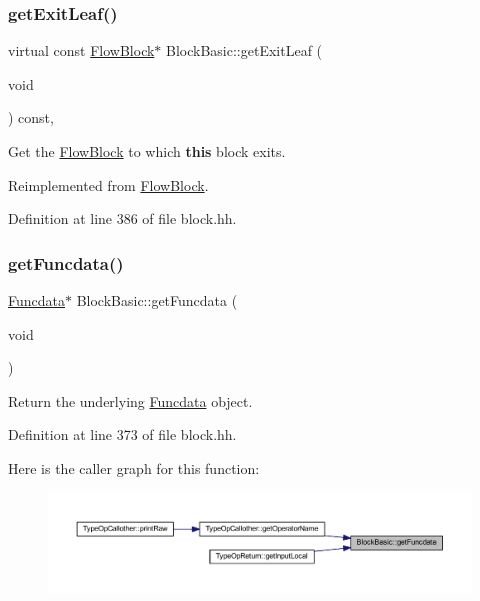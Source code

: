 \subsubsection{\texorpdfstring{getExitLeaf()}{getExitLeaf()}}
{\footnotesize\ttfamily virtual const \mbox{\hyperlink{class_flow_block}{Flow\+Block}}$\ast$ Block\+Basic\+::get\+Exit\+Leaf (\begin{DoxyParamCaption}\item[{void}]{ }\end{DoxyParamCaption}) const\hspace{0.3cm}{\ttfamily [inline]}, {\ttfamily [virtual]}}



Get the \mbox{\hyperlink{class_flow_block}{Flow\+Block}} to which {\bfseries{this}} block exits. 



Reimplemented from \mbox{\hyperlink{class_flow_block_a611bb926194635a0f5cfc0eb16cabe6a}{Flow\+Block}}.



Definition at line 386 of file block.\+hh.

\mbox{\label{class_block_basic_ade69610ab83251b3b3cf8cc437612ce4}} 
\subsubsection{\texorpdfstring{getFuncdata()}{getFuncdata()}\hspace{0.1cm}{\footnotesize\ttfamily [1/2]}}
{\footnotesize\ttfamily \mbox{\hyperlink{class_funcdata}{Funcdata}}$\ast$ Block\+Basic\+::get\+Funcdata (\begin{DoxyParamCaption}\item[{void}]{ }\end{DoxyParamCaption})\hspace{0.3cm}{\ttfamily [inline]}}



Return the underlying \mbox{\hyperlink{class_funcdata}{Funcdata}} object. 



Definition at line 373 of file block.\+hh.

Here is the caller graph for this function\+:
\nopagebreak
\begin{figure}[H]
\begin{center}
\leavevmode
\includegraphics[width=350pt]{class_block_basic_ade69610ab83251b3b3cf8cc437612ce4_icgraph}
\end{center}
\end{figure}
\mbox{\label{class_block_basic_a57fb2cc818cabc999f97b377e356f779}} 
